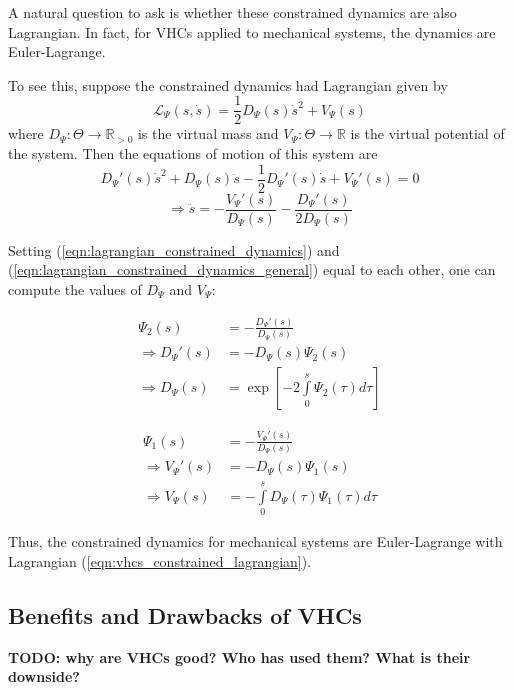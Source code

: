 A natural question to ask is whether these constrained dynamics are also
Lagrangian. In fact, for VHCs applied to mechanical systems, the dynamics are
Euler-Lagrange. \cite{lagrangian_structure_reduced_dynamics_vhcs}

To see this, suppose the constrained dynamics had Lagrangian given by
\begin{equation}\label{eqn:vhcs_constrained_lagrangian}
   \mathcal{L}_{\Psi}(s,\dot{s}) = \frac{1}{2}
   D_{\Psi}(s)\dot{s}^2 + V_{\Psi}(s)
\end{equation}
where \(D_{\Psi} : \Theta \rightarrow \mathbb{R}_{>0}\) is the virtual mass
and \(V_{\Psi} : \Theta \rightarrow \mathbb{R}\) is the virtual potential of the
system. Then the equations of motion of this system are
\begin{equation*}
   D_{\Psi}'(s)\dot{s}^2 + D_{\Psi}(s)\ddot{s} - \frac{1}{2}D_{\Psi}'(s)\dot{s}
   + V_{\Psi}'(s) = 0
\end{equation*}
\begin{equation}\label{eqn:lagrangian_constrained_dynamics_general}
   \Rightarrow \ddot{s} = -\frac{V_{\Psi}'(s)}{D_{\Psi}(s)} -
   \frac{D_{\Psi}'(s)}{2 D_{\Psi}(s)}
\end{equation}

Setting (\ref{eqn:lagrangian_constrained_dynamics}) and
(\ref{eqn:lagrangian_constrained_dynamics_general}) equal to each other, one
can compute the values of \(D_{\Psi}\) and \(V_{\Psi}\): 

\begin{minipage}{0.48\textwidth}
\begin{align*}
   \Psi_2(s) &= -\frac{D_{\Psi}'(s)}{D_\Psi(s)} \\
   \Rightarrow D_{\Psi}'(s) &= -D_{\Psi}(s) \Psi_2(s) \\
   \Rightarrow D_{\Psi}(s) &= \exp\left[ 
   -2\int \limits_{0}^s \Psi_2(\tau) d\tau \right]
\end{align*}
\end{minipage}
\begin{minipage}{0.48\textwidth}
\begin{align*}
   \Psi_1(s) &= -\frac{V_{\Psi}'(s)}{D_{\Psi}(s)} \\
   \Rightarrow V_{\Psi}'(s) &= -D_{\Psi}(s) \Psi_1(s) \\
   \Rightarrow V_{\Psi}(s) &= - \int \limits_{0}^s
   D_{\Psi}(\tau)\Psi_1(\tau)d\tau
\end{align*}
\end{minipage}

Thus, the constrained dynamics for mechanical systems are Euler-Lagrange with
Lagrangian (\ref{eqn:vhcs_constrained_lagrangian}).

\subsection{Benefits and Drawbacks of VHCs}
\textbf{TODO: why are VHCs good? Who has used them? What is their downside?}

